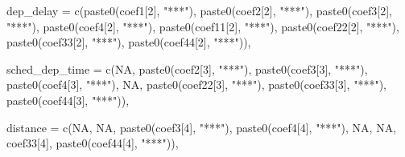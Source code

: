 \documentclass[
]{article}
\newenvironment{Shaded}{\begin{snugshade}}{\end{snugshade}}
\newcommand{\AttributeTok}[1]{\textcolor[rgb]{0.77,0.63,0.00}{#1}}
\newcommand{\DecValTok}[1]{\textcolor[rgb]{0.00,0.00,0.81}{#1}}
\newcommand{\FunctionTok}[1]{\textcolor[rgb]{0.00,0.00,0.00}{#1}}
\newcommand{\NormalTok}[1]{#1}
\newcommand{\StringTok}[1]{\textcolor[rgb]{0.31,0.60,0.02}{#1}}
\begin{document}
\begin{Shaded}
\begin{Highlighting}[]
  \AttributeTok{dep\_delay =} \FunctionTok{c}\NormalTok{(}\FunctionTok{paste0}\NormalTok{(coef1[}\DecValTok{2}\NormalTok{], }\StringTok{"***"}\NormalTok{), }
                \FunctionTok{paste0}\NormalTok{(coef2[}\DecValTok{2}\NormalTok{], }\StringTok{"***"}\NormalTok{),}
                \FunctionTok{paste0}\NormalTok{(coef3[}\DecValTok{2}\NormalTok{], }\StringTok{"***"}\NormalTok{),}
                \FunctionTok{paste0}\NormalTok{(coef4[}\DecValTok{2}\NormalTok{], }\StringTok{"***"}\NormalTok{),}
                \FunctionTok{paste0}\NormalTok{(coef11[}\DecValTok{2}\NormalTok{], }\StringTok{"***"}\NormalTok{),}
                \FunctionTok{paste0}\NormalTok{(coef22[}\DecValTok{2}\NormalTok{], }\StringTok{"***"}\NormalTok{),}
                \FunctionTok{paste0}\NormalTok{(coef33[}\DecValTok{2}\NormalTok{], }\StringTok{"***"}\NormalTok{),}
                \FunctionTok{paste0}\NormalTok{(coef44[}\DecValTok{2}\NormalTok{], }\StringTok{"***"}\NormalTok{)),}
  
  \AttributeTok{sched\_dep\_time =} \FunctionTok{c}\NormalTok{(}\StringTok{\textquotesingle{}NA\textquotesingle{}}\NormalTok{,}
                     \FunctionTok{paste0}\NormalTok{(coef2[}\DecValTok{3}\NormalTok{], }\StringTok{"***"}\NormalTok{),}
                     \FunctionTok{paste0}\NormalTok{(coef3[}\DecValTok{3}\NormalTok{], }\StringTok{"***"}\NormalTok{),}
                     \FunctionTok{paste0}\NormalTok{(coef4[}\DecValTok{3}\NormalTok{], }\StringTok{"***"}\NormalTok{),}
                     \StringTok{\textquotesingle{}NA\textquotesingle{}}\NormalTok{,}
                     \FunctionTok{paste0}\NormalTok{(coef22[}\DecValTok{3}\NormalTok{], }\StringTok{"***"}\NormalTok{),}
                     \FunctionTok{paste0}\NormalTok{(coef33[}\DecValTok{3}\NormalTok{], }\StringTok{"***"}\NormalTok{),}
                     \FunctionTok{paste0}\NormalTok{(coef44[}\DecValTok{3}\NormalTok{], }\StringTok{"***"}\NormalTok{)),}
  
  \AttributeTok{distance =} \FunctionTok{c}\NormalTok{(}\StringTok{\textquotesingle{}NA\textquotesingle{}}\NormalTok{,}
               \StringTok{\textquotesingle{}NA\textquotesingle{}}\NormalTok{,}
               \FunctionTok{paste0}\NormalTok{(coef3[}\DecValTok{4}\NormalTok{], }\StringTok{"***"}\NormalTok{),}
               \FunctionTok{paste0}\NormalTok{(coef4[}\DecValTok{4}\NormalTok{], }\StringTok{"***"}\NormalTok{),}
               \StringTok{\textquotesingle{}NA\textquotesingle{}}\NormalTok{,}
               \StringTok{\textquotesingle{}NA\textquotesingle{}}\NormalTok{,}
\NormalTok{               coef33[}\DecValTok{4}\NormalTok{],}
               \FunctionTok{paste0}\NormalTok{(coef44[}\DecValTok{4}\NormalTok{], }\StringTok{"***"}\NormalTok{)),}
  

\end{Highlighting}
\end{Shaded}
\end{document}
